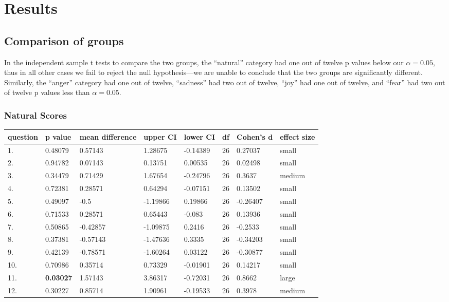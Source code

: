 \documentclass[11pt, twoside, reqno]{book}
\begin{document}
\section{Results}

\subsection{Comparison of groups}

In the independent sample t tests to compare the two groups, the ``natural'' category had one out of twelve p values below our $\alpha = 0.05$, thus in all other cases we fail to reject the null hypothesis—we are unable to conclude that the two groups are significantly different. Similarly, the ``anger'' category had one out of twelve, ``sadness'' had two out of twelve, ``joy'' had one out of twelve, and ``fear'' had two out of twelve p values less than $\alpha = 0.05$.

\subsubsection{\textbf{Natural Scores}}

\begin{tabular}{|l|l|l|l|l|l|l|l|}
\hline
    question & p value & mean difference & upper CI & lower CI & df & Cohen's d & effect size \\ \hline
    1. & 0.48079 & 0.57143 & 1.28675 & -0.14389 & 26 & 0.27037 & small \\ \hline
    2. & 0.94782 & 0.07143 & 0.13751 & 0.00535 & 26 & 0.02498 & small \\ \hline
    3. & 0.34479 & 0.71429 & 1.67654 & -0.24796 & 26 & 0.3637 & medium  \\ \hline
    4. & 0.72381 & 0.28571 & 0.64294 & -0.07151 & 26 & 0.13502 & small \\ \hline
    5. & 0.49097 & -0.5 & -1.19866 & 0.19866 & 26 & -0.26407 & small  \\ \hline
    6. & 0.71533 & 0.28571 & 0.65443 & -0.083 & 26 & 0.13936 & small \\ \hline
    7. & 0.50865 & -0.42857 & -1.09875 & 0.2416 & 26 & -0.2533 & small \\ \hline
    8. & 0.37381 & -0.57143 & -1.47636 & 0.3335 & 26 & -0.34203 & small \\ \hline
    9. & 0.42139 & -0.78571 & -1.60264 & 0.03122 & 26 & -0.30877 & small \\ \hline
    10. & 0.70986 & 0.35714 & 0.73329 & -0.01901 & 26 & 0.14217 & small \\ \hline
    11. & \textbf{0.03027} & 1.57143 & 3.86317 & -0.72031 & 26 & 0.8662 & large \\ \hline
    12. & 0.30227 & 0.85714 & 1.90961 & -0.19533 & 26 & 0.3978 & medium \\ \hline
\end{tabular}
\vspace{16pt}
\end{document}
